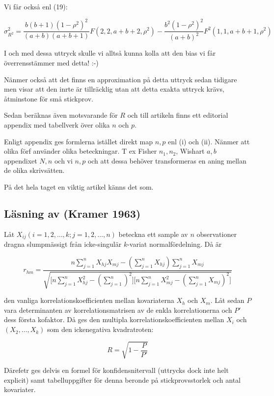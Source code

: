 \documentclass[]{article}
\begin{document}
Vi får också enl (19):

\[\sigma^2_{R^2} = \frac{b(b+1)(1-\rho^2)^2}{(a+b)(a + b +1)}F(2,2,a+b+2,\rho^2) - \frac{b^2(1-\rho^2)^2}{(a+b)^2}F^2(1,1,a+b+1, \rho^2)\]

I och med dessa uttryck skulle vi alltså kunna kolla att den bias vi får
överrensstämmer med detta! :-)

Nänmer också att det finns en approximation på detta uttryck sedan
tidigare men visar att den inrte är tillräcklig utan att detta exakta
uttryck krävs, åtminstone för små stickprov.

Sedan beräknas även motsvarande för \(R\) och till artikeln finns ett
editorial appendix med tabellverk över olika \(n\) och \(p\).

Enligt appendix ges formlerna istället direkt map \(n, p\) enl (i) och
(ii). Nänmer att olika förf använder olika beteckningar. T ex Fisher
\(n_1, n_2\), Wishart \(a, b\) appendixet \(N, n\) och vi \(n, p\) och
att dessa behöver transformeras en aning mellan de olika skrivsätten.

På det hela taget en viktig artikel känns det som.

\subsection{Läsning av (Kramer 1963)}\label{lasning-av-kramer1963}

Låt \(X_{ij} (i = 1, 2, \ldots, k; j = 1, 2, \ldots, n)\) beteckna ett
sample av \(n\) observationer dragna slumpmässigt från icke-singulär
\(k\)-variat normalfördelning. Då är

\[r_{hm} = \frac{n\sum_{j = 1}^n X_{hj}X_{mj}-(\sum_{j = 1}^nX_{hj}) \sum_{j = 1}^nX_{mj}}{
\sqrt{
   \big[
       n 
       \sum_{j = 1}^n
       X_{hj}^2-
       (\sum_{j = 1}^n)^2
    \big]
    \big[
      n
      \sum_{j = 1}^n X_{mj}^2 - 
      (\sum_{j=1}^n X_{mj})^2
    \big] 
  }
}\]

den vanliga korrelationskoefficienten mellan kovariaterna \(X_h\) och
\(X_m\). Låt sedan \(P\) vara determinanten av korrelationsmatrisen av
de enkla korrelationerna och \(P'\) dess första kofaktor. Då ges den
multipla korrelationskoefficienten mellan \(X_i\) och
\((X_2, \ldots, X_k)\) som den ickenegativa kvadratroten:

\[R = \sqrt{1 - \frac{P}{P'}}\]

Därefetr ges delvis en formel för konfidensnitervall (uttrycks dock inte
helt explicit) samt tabelluppgifter för denna beronde på
stickprovsstorlek och antal kovariater.
\end{document}
